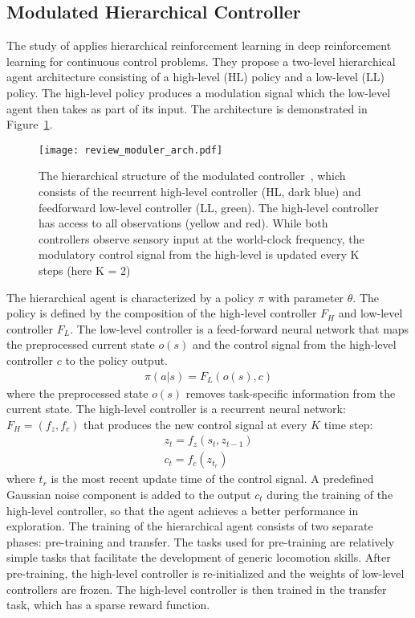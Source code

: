 \subsection{Modulated Hierarchical Controller}
The study of \cite{heess2016learning} applies hierarchical reinforcement learning in deep reinforcement learning for continuous control problems. They propose a two-level hierarchical agent architecture consisting of a high-level (HL) policy and a low-level (LL) policy. The high-level policy produces a modulation signal which the low-level agent then takes as part of its input. The architecture is demonstrated in Figure~\ref{review_moduler_arch}.
\begin{figure}[h]
	\texttt{[image: review\_moduler\_arch.pdf]}
	\centering
	\caption{The hierarchical structure of the modulated controller~\cite{heess2016learning}, which consists
		of the recurrent high-level controller (HL, dark blue) and
		feedforward low-level controller (LL, green).  The
		high-level controller has access to all observations (yellow and red). While both controllers observe sensory
		input at the world-clock frequency, the modulatory control signal from the high-level is updated every K
		steps (here K = 2)}\label{review_moduler_arch}
\end{figure}
The hierarchical agent is characterized by a policy $\pi$ with parameter $\theta$. The policy is defined by the composition of the high-level controller $F_H$ and low-level controller $F_L$. The low-level controller is a feed-forward neural network that maps the preprocessed current state $o(s)$ and the control signal from the high-level controller $c$ to the policy output.
\begin{align}
\pi (a| s) = F_L(o(s),c)
\end{align}
where the preprocessed state $o(s)$ removes task-specific information from the current state.
The high-level controller is a recurrent neural network: $F_H = (f_z,f_c)$ that produces the new control signal at every $K$ time step:
\begin{align}
z_t = f_z(s_t,z_{t-1}) \\
c_t = f_c(z_{t_r})
\end{align}
where $t_r$ is the most recent update time of the control signal. A predefined Gaussian noise component is added to the output $c_t$ during the training of the high-level controller, so that the agent achieves a better performance in exploration.
The training of the hierarchical agent consists of two separate phases: pre-training and transfer. The tasks used for pre-training are relatively simple tasks that facilitate the development of generic locomotion skills. After pre-training, the high-level controller is re-initialized and the weights of low-level controllers are frozen. The high-level controller is then trained in the transfer task, which has a sparse reward function.

